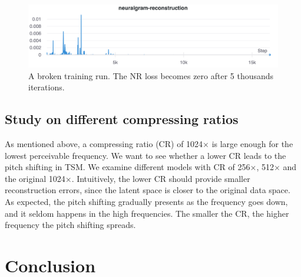 \documentclass[12pt]{article}
\begin{document}
\begin{figure}
\begin{center}
  \includegraphics[width=\textwidth]{assets/figures/broken-nr}
\end{center}
\caption{A broken training run. The NR loss becomes zero after 5 thousands iterations.}
\label{fig:broken-nr}
\end{figure}

\subsection{Study on different compressing ratios}
As mentioned above, a compressing ratio (CR) of 1024$\times$ is large enough for the lowest perceivable frequency. We want to see whether a lower CR leads to the pitch shifting in TSM. We examine different models with CR of 256$\times$, 512$\times$ and the original 1024$\times$. Intuitively, the lower CR should provide smaller reconstruction errors, since the latent space is closer to the original data space. As expected, the pitch shifting gradually presents as the frequency goes down, and it seldom happens in the high frequencies. The smaller the CR, the higher frequency the pitch shifting spreads.

\section{Conclusion}



\end{document}
